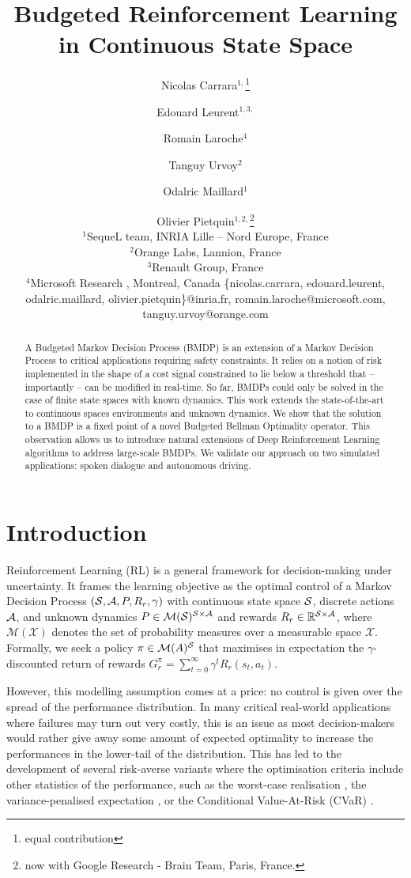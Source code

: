\documentclass{article}
\title{Budgeted Reinforcement Learning in Continuous State Space}
\author{
Nicolas Carrara$^{1,}$\thanks{equal contribution}\and
Edouard Leurent$^{1,3,}$\footnotemark[1]\and
Romain Laroche$^{4}$\and
Tanguy Urvoy$^{2}$\and
Odalric Maillard$^{1}$\and
Olivier Pietquin$^{1,2,}$\thanks{now with Google Research - Brain Team, Paris, France.}\\
\affiliations $^1$SequeL team, INRIA Lille -- Nord Europe, France\\
$^2$Orange Labs, Lannion, France\\
$^3$Renault Group, France\\
$^4$Microsoft Research , Montreal, Canada
\emails
\{nicolas.carrara, edouard.leurent, odalric.maillard, olivier.pietquin\}@inria.fr,
romain.laroche@microsoft.com, tanguy.urvoy@orange.com
}
\begin{document}
\maketitle
\begin{abstract}
    A Budgeted Markov Decision Process (BMDP) is an extension of a Markov Decision Process to critical applications requiring safety constraints. It relies on a notion of risk implemented in the shape of a cost signal constrained  to lie below a threshold that -- importantly -- can be modified in real-time. So far, BMDPs could only be solved in the case of finite state spaces with known dynamics. This work extends the state-of-the-art to continuous spaces environments and unknown dynamics. We show that the solution to a BMDP is a fixed point of a novel Budgeted Bellman Optimality operator. This observation allows us to introduce natural extensions of Deep Reinforcement Learning algorithms to address large-scale BMDPs. We validate our approach on two simulated applications: spoken dialogue and autonomous driving.
\end{abstract}


\section{Introduction}

Reinforcement Learning (RL) is a general framework for decision-making under uncertainty. It frames the learning objective as the optimal control of a Markov Decision Process  $(\mathcal{S}, \mathcal{A}, P, R_r, \gamma)$ with continuous state space $\mathcal{S}$, discrete actions $\mathcal{A}$, and unknown dynamics $P\in \mathcal{M}(\mathcal{S})^{\mathcal{S} \times \mathcal{A}}$ and rewards $R_r\in\mathbb{R}^{\mathcal{S} \times \mathcal{A}}$, where $\mathcal{M}(\mathcal{X})$ denotes the set of probability measures over a measurable space $\mathcal{X}$. Formally, we seek a policy $\pi\in\mathcal{M}(A)^{\mathcal{S}}$ that maximises in expectation the $\gamma$-discounted return of rewards $G_r^\pi = \sum_{t=0}^\infty \gamma^t R_r(s_t, a_t)$.

However, this modelling assumption comes at a price: no control is given over the spread of the performance distribution. In many critical real-world applications where failures may turn out very costly, this is an issue as most decision-makers would rather give away some amount of expected optimality to increase the performances in the lower-tail of the distribution. This has led to the development of several risk-averse variants where the optimisation criteria include other statistics of the performance, such as the worst-case realisation \citep{Iyengar2005,Nilim2005,Wiesemann2013}, the variance-penalised expectation \citep{Garcia2015,Tamar2012}, or the Conditional Value-At-Risk (CVaR) \citep{Chow2014,DBLP:journals/corr/ChowGJP15}.
\end{document}
